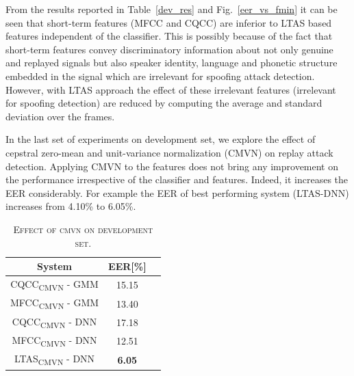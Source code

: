 \documentclass{article}
\begin{document}
From the results reported in Table~\ref{dev_res} and Fig.~\ref{eer_vs_fmin} it can be seen that short-term features
(MFCC and CQCC) are inferior to LTAS based features independent of the classifier. This is possibly because of the
fact that short-term features convey discriminatory information about not only genuine and replayed signals but also
speaker identity, language and phonetic structure embedded in the signal which are irrelevant for spoofing attack
detection. However, with LTAS approach the effect of these irrelevant features (irrelevant for spoofing detection) are
reduced by computing the average and standard deviation over the frames.

In the last set of experiments on development set, we explore the effect of cepstral zero-mean and unit-variance
normalization (CMVN) on replay attack detection. Applying CMVN to the features does not bring any improvement on the
performance irrespective of the classifier and features. Indeed, it increases the EER considerably. For example the
EER of best performing system (LTAS-DNN) increases from 4.10\% to 6.05\%.

\begin{table}[!htb]
    \centering
    \caption{\textsc{Effect of cmvn on development set.}}
    \vspace{4mm}
    \label{norm}
    \begin{tabular}{|c|c|c|}
        \hline
        System                         & EER[\%]       \\ \hline
        CQCC\textsubscript{CMVN} - GMM & 15.15         \\
        MFCC\textsubscript{CMVN} - GMM & 13.40         \\
        CQCC\textsubscript{CMVN} - DNN & 17.18         \\
        MFCC\textsubscript{CMVN} - DNN & 12.51         \\
        LTAS\textsubscript{CMVN} - DNN & \textbf{6.05} \\
        \hline
    \end{tabular}
\end{table}
\end{document}
